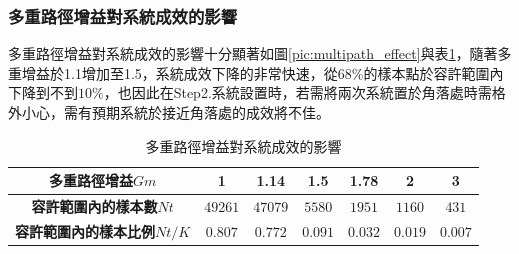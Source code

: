     \subsubsection{多重路徑增益對系統成效的影響}
    \label{chp:multipath_bandwidth}

    多重路徑增益對系統成效的影響十分顯著如圖\ref{pic:multipath_effect}與表\ref{tab:multipath_effect}，隨著多重增益於1.1增加至1.5，系統成效下降的非常快速，從$68\%$的樣本點於容許範圍內下降到不到$10\%$，也因此在Step2.系統設置時，若需將兩次系統置於角落處時需格外小心，需有預期系統於接近角落處的成效將不佳。



    \begin{table}[htpb]
        \begin{center}
          \caption{多重路徑增益對系統成效的影響}
          \label{tab:multipath_effect}
          \begin{tabular}{|c||c|c|c|c|c|c|} %
            \hline  
           \textbf{多重路徑增益$Gm$} &
           1&
           1.14&
           1.5&
           1.78&
           2&
           3
           \\\hline\hline

           \textbf{容許範圍內的樣本數$Nt$} &
           $49261$&
           $47079$&
           $5580$&
           $1951$&
           $1160$&
           $431$
           \\\hline

           \textbf{容許範圍內的樣本比例$Nt/K$} &
           $0.807$&
           $0.772$&
           $0.091$&
           $0.032$&
           $0.019$&
           $0.007$
           \\\hline
         \end{tabular}
       \end{center}
     \end{table}

